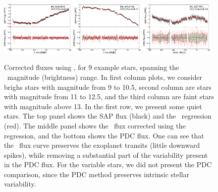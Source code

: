 \begin{figure}[p]
\begin{center}
\includegraphics[width=0.32\textwidth]{figures/cpm/f5g}
\hfill
\includegraphics[width=0.32\textwidth]{figures/cpm/f5h}
\hfill
\includegraphics[width=0.32\textwidth]{figures/cpm/f5i}
\end{center}

\caption{
  \label{fluxes} 
  Corrected fluxes using \name, for 9 example stars, spanning the \Kepler\ magnitude (brightness) range. 
  In first column plots, we consider brighs stars with magnitude from 9 to 10.5, second column are stars with magnitude from 11 to 12.5, and the third column are faint stars with magnitude above 13. 
  In the first row, we present some quiet stars. 
  The top panel shows the SAP flux (black) and the \name\ regression (red). 
  The middle panel shows the \name\ flux corrected using the regression, and the bottom shows the PDC flux. 
  One can see that the \name\ flux curve preserves the exoplanet transits (little downward spikes), while removing a substantial part of the variability present in the PDC flux.  
  For the variable stars, we did not present the PDC comparison, since the PDC method preserves intrinsic stellar variability.
}
\end{figure}

